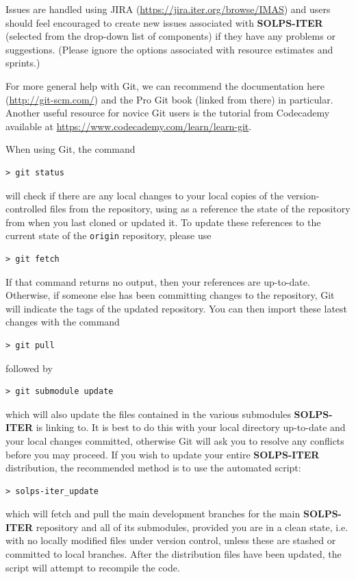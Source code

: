 \documentclass[a4paper,10pt]{report}
\newcommand\SOLPSITER{{\bf SOLPS-ITER} }
\begin{document}
Issues are handled using JIRA (\href{https://jira.iter.org/browse/IMAS}{https://jira.iter.org/browse/IMAS}) and users should feel encouraged to create new issues associated with \SOLPSITER (selected from the drop-down list of components) if they have any problems or suggestions. (Please ignore the options associated with resource estimates and sprints.)

For more general help with Git, we can recommend the documentation here (\href{http://git-scm.com/}{http://git-scm.com/}) and the Pro Git book (linked from there) in particular. Another useful resource for novice Git users is the tutorial from Codecademy available at \href{https://www.codecademy.com/learn/learn-git}{https://www.codecademy.com/learn/learn-git}.

When using Git, the command
\begin{verbatim}
> git status
\end{verbatim}
will check if there are any local changes to your local copies of the version-controlled files from the repository, using as a reference the state of the repository from when you last cloned or updated it. To update these
references to the current state of the {\tt origin} repository, please use
\begin{verbatim}
> git fetch
\end{verbatim}
If that command returns no output, then your references are up-to-date. Otherwise, if someone else has
been committing changes to the repository, Git will indicate the tags of the updated repository. You can then import these latest changes with the command
\begin{verbatim}
> git pull
\end{verbatim}
followed by
\begin{verbatim}
> git submodule update
\end{verbatim}
which will also update the files contained in the various submodules \SOLPSITER is linking to. It is best to do this with your local directory up-to-date and your local changes committed, otherwise Git will ask you to resolve any conflicts before you may proceed. If you wish to update your entire \SOLPSITER distribution, the recommended method is to use the automated script:
\begin{verbatim}
> solps-iter_update
\end{verbatim}
which will fetch and pull the main development branches for the main \SOLPSITER repository and all of its submodules, provided you are in a clean state, i.e. with no locally modified files under version control, unless these are stashed or committed to local branches. After the distribution files have been updated, the script will attempt to recompile the code.
\end{document}
